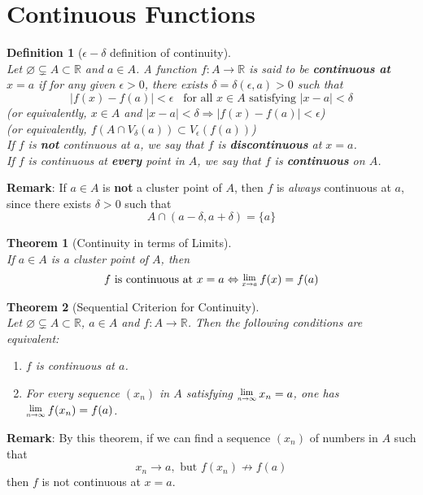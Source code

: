 \documentclass[8pt]{article}
\newcommand{\Lim}[1]{\raisebox{0.5ex}{\scalebox{0.8}{$\displaystyle \lim_{#1}\;$}}}
\newtheorem{definition}{Definition}[section]
\newtheorem{theorem}{Theorem}[section]
\theoremstyle{definition}
\begin{document}
\section{Continuous Functions}
\begin{definition}[$\epsilon-\delta$ definition of continuity]
\hfill\\\normalfont Let $\varnothing\subsetneq A\subset\mathbb{R}$ and $a\in A$. A function $f:A\to \mathbb{R}$ is said to be \textbf{continuous at} $x=a$ if for any given $\epsilon>0$, there exists $\delta=\delta(\epsilon, a)>0$ such that
\[
|f(x)-f(a)|<\epsilon\;\;\;\text{for all }x\in A\text{ satisfying }|x-a|<\delta
\]
(or equivalently, $x\in A$ and $|x-a|<\delta\Rightarrow |f(x)-f(a)|<\epsilon$)\\
(or equivalently, $f(A\cap V_\delta(a))\subset V_\epsilon(f(a))$)\\
If $f$ is \textbf{not} continuous at $a$, we say that $f$ is \textbf{discontinuous} at $x=a$.\\
If $f$ is continuous at \textbf{every} point in $A$, we say that $f$ is \textbf{continuous} on $A$.
\end{definition}
\textbf{Remark}: If $a\in A$ is \textbf{not} a cluster point of $A$, then $f$ is \textit{always} continuous at $a$, since there exists $\delta>0$ such that
\[
A\cap(a-\delta, a+\delta)=\{a\}
\] 
\begin{theorem}[Continuity in terms of Limits]
\hfill\\\normalfont If $a\in A$ is a cluster point of $A$, then
\[
f \text{ is continuous at }x=a\Leftrightarrow \Lim{x\to a}f(x)=f(a)
\]
\end{theorem}
\begin{theorem}[Sequential Criterion for Continuity]
\hfill\\\normalfont Let $\varnothing\subsetneq A\subset\mathbb{R}$, $a\in A$ and $f:A\to\mathbb{R}$. Then the following conditions are equivalent:
\begin{enumerate}
\item $f$ is continuous at $a$.
\item For every sequence $(x_n)$ in $A$ satisfying $\Lim{n\to \infty}x_n=a$, one has $\Lim{n\to \infty}f(x_n)=f(a)$.
\end{enumerate}
\end{theorem}
\textbf{Remark}: By this theorem, if we can find a sequence $(x_n)$ of numbers in $A$ such that
\[
x_n\to a,\text{  but  }f(x_n)\not\to f(a)
\]
then $f$ is not continuous at $x=a$.\\
\end{document}
